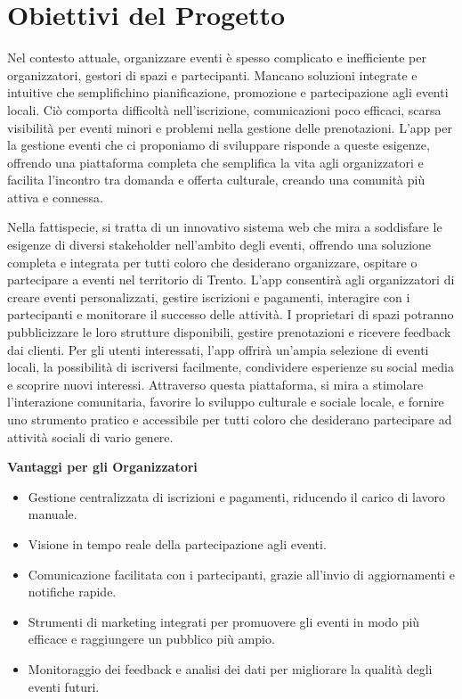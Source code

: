 \documentclass[9pt]{extarticle}
\begin{document}
\customtitle



\tableofcontents
\newpage

\section{Obiettivi del Progetto}

Nel contesto attuale, organizzare eventi è spesso complicato e inefficiente per
organizzatori, gestori di spazi e partecipanti. Mancano soluzioni integrate e intuitive che semplifichino pianificazione, promozione e partecipazione agli eventi locali. Ciò comporta difficoltà nell'iscrizione, comunicazioni poco efficaci, scarsa visibilità per eventi minori e problemi nella gestione delle prenotazioni. L'app per la gestione eventi che ci proponiamo di sviluppare risponde a queste esigenze, offrendo una piattaforma completa che semplifica la vita agli organizzatori e facilita l'incontro tra domanda e offerta culturale, creando una comunità più attiva e connessa.

Nella fattispecie, si tratta di un innovativo sistema web che mira a soddisfare le esigenze di diversi stakeholder nell'ambito degli eventi, offrendo una soluzione completa e integrata per tutti coloro che desiderano organizzare, ospitare o partecipare a eventi nel territorio di Trento. L'app consentirà agli organizzatori di creare eventi personalizzati, gestire iscrizioni e pagamenti, interagire con i partecipanti e monitorare il successo delle attività. I proprietari di spazi potranno pubblicizzare le loro strutture disponibili, gestire prenotazioni e ricevere feedback dai clienti. Per gli utenti interessati, l'app offrirà un'ampia selezione di eventi locali, la possibilità di iscriversi facilmente, condividere esperienze su social media e scoprire nuovi interessi. Attraverso questa piattaforma, si mira a stimolare l'interazione comunitaria, favorire lo sviluppo culturale e sociale locale, e fornire uno strumento pratico e accessibile per tutti coloro che desiderano partecipare ad attività sociali di vario genere.

\textbf{Vantaggi per gli Organizzatori}
\begin{itemize}
	\item Gestione centralizzata di iscrizioni e pagamenti, riducendo il carico di lavoro manuale.
	\item Visione in tempo reale della partecipazione agli eventi.
	\item Comunicazione facilitata con i partecipanti, grazie all'invio di aggiornamenti e notifiche rapide.
	\item Strumenti di marketing integrati per promuovere gli eventi in modo più efficace e raggiungere un pubblico più ampio.
	\item Monitoraggio dei feedback e analisi dei dati per migliorare la qualità degli eventi futuri.
\end{itemize}
\end{document}
